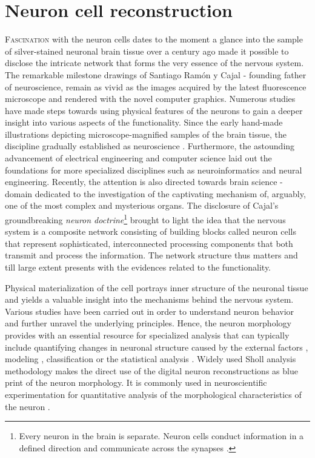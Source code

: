 \section{Neuron cell reconstruction} 
\lettrine{F}{ascination} with the neuron cells dates to the moment a glance into the sample of silver-stained neuronal brain tissue over a century ago made it possible to disclose the intricate network that forms the very essence of the nervous system. The remarkable milestone drawings of Santiago Ram\'{o}n y Cajal \cite{swanson2017,ramon2008histologia} - founding father of neuroscience, remain as vivid as the images acquired by the latest fluorescence microscope and rendered with the novel computer graphics. Numerous studies \cite{ascoli2001computer,defelipe2013new,defelipe2002microstructure,defelipe1992pyramidal,van2001need,scorcioni2004quantitative,mason2007initiation,gensel2010semi} have made steps towards using physical features of the neurons to gain a deeper insight into various aspects of the functionality. Since the early hand-made illustrations depicting microscope-magnified samples of the brain tissue, the discipline gradually established as neuroscience \cite{kandel2000principles}. Furthermore, the astounding advancement of electrical engineering and computer science laid out the foundations for more specialized disciplines such as neuroinformatics and neural engineering. Recently, the attention is also directed towards brain science - domain dedicated to the investigation of the captivating mechanism of, arguably, one of the most complex and mysterious organs. The disclosure of Cajal's groundbreaking \textit{neuron doctrine}\footnote{Every neuron in the brain is separate. Neuron cells conduct information in a defined direction and communicate across the synapses \cite{glickstein2006golgi}.} brought to light the idea that the nervous system is a composite network consisting of building blocks called neuron cells that represent sophisticated, interconnected processing components that both transmit and process the information. The network structure thus matters and till large extent presents with the evidences related to the functionality.

Physical materialization of the cell portrays inner structure of the neuronal tissue and yields a valuable insight into the mechanisms behind the nervous system. Various studies have been carried out in order to understand neuron behavior and further unravel the underlying principles. Hence, the neuron morphology provides with an essential resource for specialized analysis that can typically include quantifying changes in neuronal structure caused by the external factors \cite{gomez2007immobilized,koppes2011neurite}, modeling \cite{ascoli2001computer}, classification \cite{armananzas2015towards} or the statistical analysis \cite{samsonovich2005statistical}. Widely used Sholl analysis methodology \cite{sholl1953dendritic} makes the direct use of the digital neuron reconstructions as blue print of the neuron morphology. It is commonly used in neuroscientific experimentation for quantitative analysis of the morphological characteristics of the neuron \cite{garcia2014new}. 

